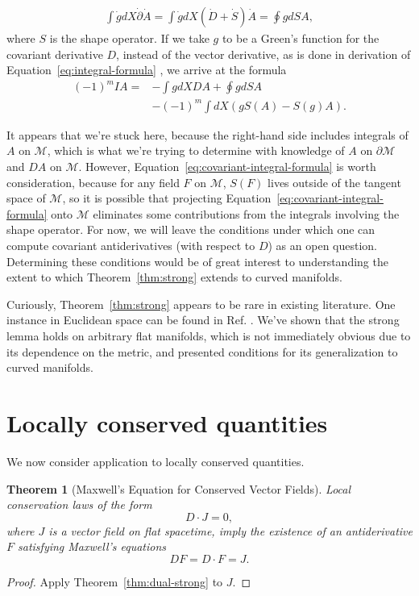 \documentclass[twocolumn,notitlepage,nofootinbib,tightenlines]{revtex4-1}
\newtheorem{thm}{Theorem}[section]
\theoremstyle{definition}
\theoremstyle{remark}
\numberwithin{equation}{section}
\begin{document}
\begin{align}
    \int \dot g dX \dot \partial \dot A = \int \dot g dX (\dot D + \dot S) \dot A = \oint g dS A,
\end{align}
%
where $S$ is the shape operator. If we take $g$ to be a Green's function for the covariant derivative $D$, instead of the vector derivative, as is done in derivation of Equation~\ref{eq:integral-formula} \cite{hestenes}, we arrive at the formula
%
\begin{align}\label{eq:covariant-integral-formula}
    (-1)^m I A = &- \int g dX D A + \oint g dS A\\
    &- (-1)^m \int dX (g S (A) - S(g) A). \nonumber
\end{align}

It appears that we're stuck here, because the right-hand side includes integrals of $A$ on $\mathcal{M}$, which is what we're trying to determine with knowledge of $A$ on $\partial{\mathcal{M}}$ and $DA$ on $\mathcal{M}$. However, Equation~\ref{eq:covariant-integral-formula} is worth consideration, because for any field $F$ on $\mathcal{M}$, $S(F)$ lives outside of the tangent space of $\mathcal{M}$, so it is possible that projecting Equation~\ref{eq:covariant-integral-formula} onto $\mathcal{M}$ eliminates some contributions from the integrals involving the shape operator. For now, we will leave the conditions under which one can compute covariant antiderivatives (with respect to $D$) as an open question. Determining these conditions would be of great interest to understanding the extent to which Theorem~\ref{thm:strong} extends to curved manifolds.

Curiously, Theorem~\ref{thm:strong} appears to be rare in existing literature. One instance in Euclidean space can be found in Ref. \cite{brackx}. We've shown that the strong lemma holds on arbitrary flat manifolds, which is not immediately obvious due to its dependence on the metric, and presented conditions for its generalization to curved manifolds.

\section{Locally conserved quantities}

We now consider application to locally conserved quantities.
%
\begin{thm}[Maxwell's Equation for Conserved Vector Fields]\label{thm:conserved-currents} Local conservation laws of the form
%
    \begin{equation}
        D \cdot J = 0,
    \end{equation}
%
    where $J$ is a vector field on flat spacetime, imply the existence of an antiderivative $F$ satisfying Maxwell's equations
%
    \begin{equation}
        D F = D \cdot F = J.
    \end{equation}
\end{thm}
%
\begin{proof}
    Apply Theorem~\ref{thm:dual-strong} to $J$.
\end{proof}
\end{document}
